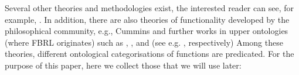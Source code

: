 \documentclass[
]{ceurart}
\begin{document}
Several other theories and methodologies exist, 
the interested reader can see, for example, \cite{umedaFunctionBehaviourStructure1990,qianFunctionBehaviorStructure1996, zhaoStateBehaviorFunction2019}.
In addition, there are also theories of functionality developed by the philosophical community, e.g., Cummins \cite{cumminsFunctionalAnalysis1975} and further works in upper ontologies (where FBRL originates) such as \BFO, \GFO, \YAMATO and \DOLCE (see e.g. \cite{spearFunctionsBasicFormal2016, herreGeneralFormalOntology2006, sasajimaFBRLFunctionBehavior1995, borgoFormalOntologicalPerspective2009}, respectively)
Among these theories, different ontological categorisations of functions are predicated. 
For the purpose of this paper, here we collect those that we will use later:
\end{document}
